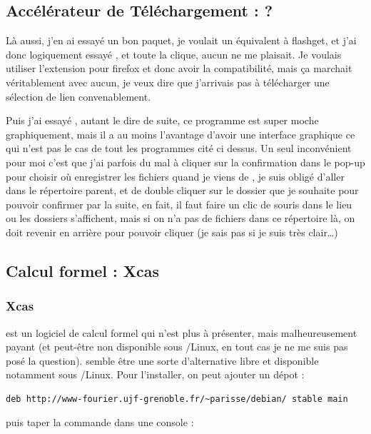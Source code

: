 \documentclass[a4paper,twoside]{article}
\begin{document}
\subsection{Accélérateur de Téléchargement : ?}
Là aussi, j'en ai essayé un bon paquet, je voulait un équivalent à flashget, et j'ai donc logiquement essayé ,  et toute la clique, aucun ne me plaisait. Je voulais utiliser l'extension  pour firefox et donc avoir la compatibilité, mais ça marchait véritablement avec aucun, je veux dire que j'arrivais pas à télécharger une sélection de lien convenablement.

Puis j'ai essayé , autant le dire de suite, ce programme est super moche graphiquement, mais il a au moins l'avantage d'avoir une interface graphique ce qui n'est pas le cas de tout les programmes cité ci dessus. Un seul inconvénient pour moi c'est que j'ai parfois du mal à cliquer sur la confirmation dans le pop-up pour choisir où enregistrer les fichiers quand je viens de , je suis obligé d'aller dans le répertoire parent, et de double cliquer sur le dossier que je souhaite pour pouvoir confirmer par la suite, en fait, il faut faire un clic de souris dans le lieu ou les dossiers s'affichent, mais si on n'a pas de fichiers dans ce répertoire là, on doit revenir en arrière pour pouvoir cliquer (je sais pas si je suis très clair\dots)

\subsection{Calcul formel : Xcas}
\subsubsection{Xcas}
 est un logiciel de calcul formel qui n'est plus à présenter, mais malheureusement payant (et peut-être non disponible sous /Linux, en tout cas je ne me suis pas posé la question).  semble être une sorte d'alternative libre  et disponible notamment sous /Linux. Pour l'installer, on peut ajouter un dépot :

\begin{verbatim}
deb http://www-fourier.ujf-grenoble.fr/~parisse/debian/ stable main
\end{verbatim}

puis taper la commande dans une console :
\end{document}
